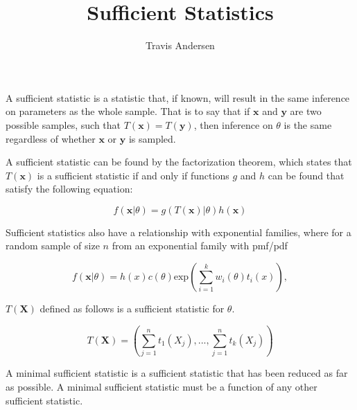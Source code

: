 \documentclass{article}
\title{Sufficient Statistics}
\author{Travis Andersen}
\begin{document}
\maketitle

A sufficient statistic is a statistic that, if known, will result in the same inference on parameters as the whole sample. That is to say that if $\textbf{x}$ and $\textbf{y}$ are two possible samples, such that $T(\textbf{x}) = T(\textbf{y})$, then inference on $\theta$ is the same regardless of whether $\textbf{x}$ or $\textbf{y}$ is sampled. 

A sufficient statistic can be found by the factorization theorem, which states that $T(\textbf{x})$ is a sufficient statistic if and only if functions $g$ and $h$ can be found that satisfy the following equation:  

\begin{equation*}
  f(\textbf{x}|\theta) = g(T(\textbf{x})|\theta) h(\textbf{x})
\end{equation*}

Sufficient statistics also have a relationship with exponential families, where for a random sample of size $n$ from an exponential family with pmf/pdf

\begin{equation*}
  f(\textbf{x}|\theta) = h(x) c(\theta) \text{exp}(\sum_{i=1}^k w_i(\theta) t_i(x)),
\end{equation*}

$T(\textbf{X})$ defined as follows is a sufficient statistic for $\theta$. 

\begin{equation*}
  T(\textbf{X}) = (\sum_{j=1}^n t_1(X_j), ..., \sum_{j=1}^n t_k(X_j))
\end{equation*}

A minimal sufficient statistic is a sufficient statistic that has been reduced as far as possible. A minimal sufficient statistic must be a function of any other sufficient statistic. 
\end{document}
